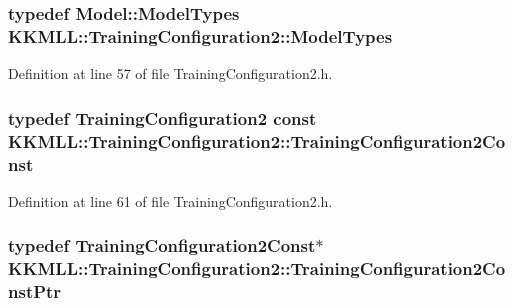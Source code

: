 \subsubsection[{\texorpdfstring{Model\+Types}{ModelTypes}}]{\setlength{\rightskip}{0pt plus 5cm}typedef {\bf Model\+::\+Model\+Types} {\bf K\+K\+M\+L\+L\+::\+Training\+Configuration2\+::\+Model\+Types}}\hypertarget{class_k_k_m_l_l_1_1_training_configuration2_ab6544af2d8be1885e676b81a10324cda}{}\label{class_k_k_m_l_l_1_1_training_configuration2_ab6544af2d8be1885e676b81a10324cda}


Definition at line 57 of file Training\+Configuration2.\+h.

\subsubsection[{\texorpdfstring{Training\+Configuration2\+Const}{TrainingConfiguration2Const}}]{\setlength{\rightskip}{0pt plus 5cm}typedef {\bf Training\+Configuration2} const {\bf K\+K\+M\+L\+L\+::\+Training\+Configuration2\+::\+Training\+Configuration2\+Const}}\hypertarget{class_k_k_m_l_l_1_1_training_configuration2_a4d33ba048f73ef16a421b40e39ddc80b}{}\label{class_k_k_m_l_l_1_1_training_configuration2_a4d33ba048f73ef16a421b40e39ddc80b}


Definition at line 61 of file Training\+Configuration2.\+h.

\subsubsection[{\texorpdfstring{Training\+Configuration2\+Const\+Ptr}{TrainingConfiguration2ConstPtr}}]{\setlength{\rightskip}{0pt plus 5cm}typedef {\bf Training\+Configuration2\+Const}$\ast$ {\bf K\+K\+M\+L\+L\+::\+Training\+Configuration2\+::\+Training\+Configuration2\+Const\+Ptr}}\hypertarget{class_k_k_m_l_l_1_1_training_configuration2_ac571c80e182ec908dabdfd3097142b89}{}\label{class_k_k_m_l_l_1_1_training_configuration2_ac571c80e182ec908dabdfd3097142b89}



